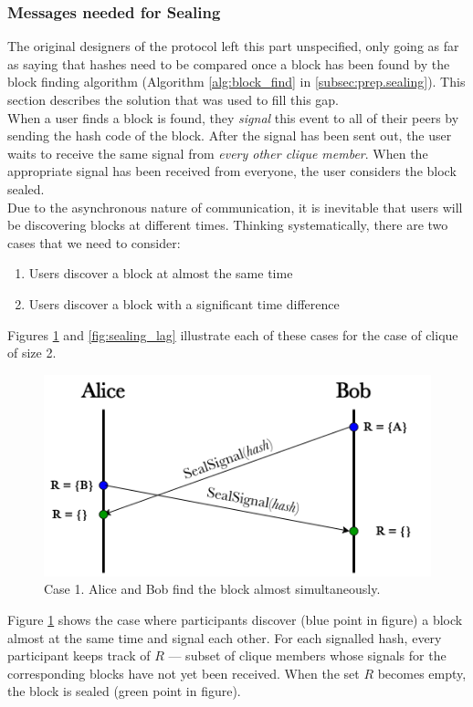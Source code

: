 \documentclass[a4paper, 12pt]{report}
\begin{document}
\subsubsection{Messages needed for Sealing}
The original designers of the protocol left this part unspecified, only going as far as saying that hashes need to be compared once a block has been found by the block finding algorithm (Algorithm \ref{alg:block_find} in \cref{subsec:prep.sealing}). This section describes the solution that was used to fill this gap. \\

When a user finds a block is found, they \emph{signal} this event to all of their peers by sending the hash code of the block. After the signal has been sent out, the user waits to receive the same signal from \emph{every other clique member}. When the appropriate signal has been received from everyone, the user considers the block sealed. \\

Due to the asynchronous nature of communication, it is inevitable that users will be discovering blocks at different times. Thinking systematically, there are two cases that we need to consider:
\begin{enumerate}
    \item Users discover a block at almost the same time
    \item Users discover a block with a significant time difference
\end{enumerate}
Figures \ref{fig:sealing_simult} and \ref{fig:sealing_lag} illustrate each of these cases for the case of clique of size 2.

\begin{figure}[H]
    \captionsetup{width=0.85\textwidth}
    \centering
    \includegraphics[width=0.6\linewidth]{pics/sealing_simult.png}
    \caption{\label{fig:sealing_simult} Case 1. Alice and Bob find the block almost simultaneously.}
\end{figure}
Figure \ref{fig:sealing_simult} shows the case where participants discover ({\color{blue}blue} point in figure) a block almost at the same time and signal each other. For each signalled hash, every participant keeps track of $R$ --- subset of clique members whose signals for the corresponding blocks have not yet been received. When the set $R$ becomes empty, the block is sealed ({\color{deepgreen}green} point in figure).
\end{document}
